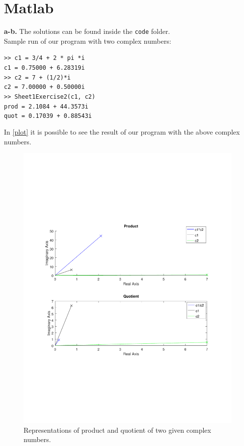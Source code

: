 \documentclass[12pt]{article}
\begin{document}
	\section{Matlab}
	\textbf{a-b.} The solutions can be found inside the \texttt{code} folder.\\
	Sample run of our program with two complex numbers:
	\begin{flushleft}
		\texttt{>> c1 = 3/4 + 2 * pi *i}\\
		\texttt{c1 = 0.75000 + 6.28319i}\\
		\texttt{>> c2 = 7 + (1/2)*i}\\
		\texttt{c2 = 7.00000 + 0.50000i}\\
		\texttt{>> Sheet1Exercise2(c1, c2)}\\
		\texttt{prod = 2.1084 + 44.3573i}\\
		\texttt{quot = 0.17039 + 0.88543i}
	\end{flushleft}
	In \autoref{plot} it is possible to see the result of our program with the above complex numbers.
	\begin{figure}[H]
	\label{plot}
	\includegraphics[width=\textwidth]{plot.pdf}
	\caption{Representations of product and quotient of two given complex numbers.}
	\end{figure}
\end{document}
